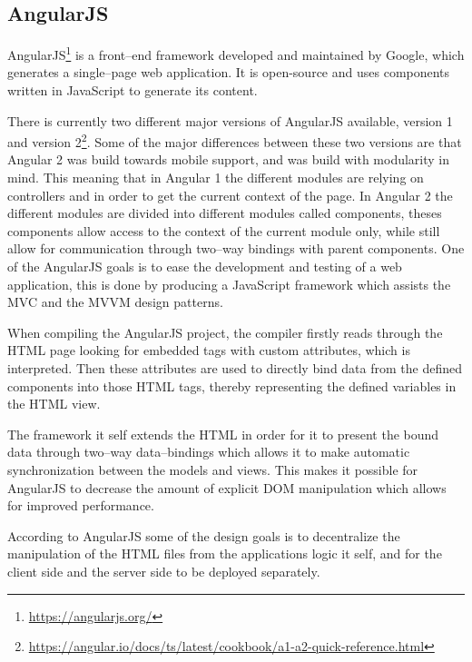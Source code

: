 \subsection{AngularJS} \label{ssec:angular}
AngularJS\footnote{\url{https://angularjs.org/}} is a front--end framework developed and maintained by Google, which generates a single--page web application.
It is open-source and uses components written in JavaScript to generate its content.

\bigskip
There is currently two different major versions of AngularJS available, version 1 and version 2\footnote{\url{https://angular.io/docs/ts/latest/cookbook/a1-a2-quick-reference.html}}.
Some of the major differences between these two versions are that Angular 2 was build towards mobile support, and was build with modularity in mind.
This meaning that in Angular 1 the different modules are relying on controllers and  in order to get the current context of the page.
In Angular 2 the different modules are divided into different modules called components, theses components allow access to the context of the current module only, while still allow for communication through two--way bindings with parent components.
One of the AngularJS goals is to ease the development and testing of a web application, this is done by producing a JavaScript framework which assists the MVC and the MVVM design patterns.

\bigskip
When compiling the AngularJS project, the compiler firstly reads through the HTML page looking for embedded tags with custom attributes, which is interpreted.
Then these attributes are used to directly bind data from the defined components into those HTML tags, thereby representing the defined variables in the HTML view.

The framework it self extends the HTML in order for it to present the bound data through two--way data--bindings which allows it to make automatic synchronization between the models and views.
This makes it possible for AngularJS to decrease the amount of explicit \ac{DOM} manipulation which allows for improved performance.

According to AngularJS some of the design goals is to decentralize the manipulation of the HTML files from the applications logic it self, and for the client side and the server side to be deployed separately.

